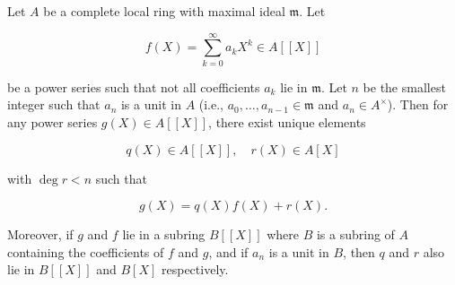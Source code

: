 Let $A$ be a complete local ring with maximal ideal $\mathfrak{m}$. Let

$$f(X) = \sum_{k=0}^{\infty} a_k X^k \in A[[X]]$$

be a power series such that not all coefficients $a_k$ lie in $\mathfrak{m}$. Let $n$ be the smallest integer such that $a_n$ is a unit in $A$ (i.e., $a_0, \dots, a_{n-1} \in \mathfrak{m}$ and $a_n \in A^\times$). Then for any power series $g(X) \in A[[X]]$, there exist unique elements

$$q(X) \in A[[X]], \quad r(X) \in A[X]$$

with $\deg r < n$ such that

$$g(X) = q(X) f(X) + r(X).$$

Moreover, if $g$ and $f$ lie in a subring $B[[X]]$ where $B$ is a subring of $A$ containing the coefficients of $f$ and $g$, and if $a_n$ is a unit in $B$, then $q$ and $r$ also lie in $B[[X]]$ and $B[X]$ respectively.
